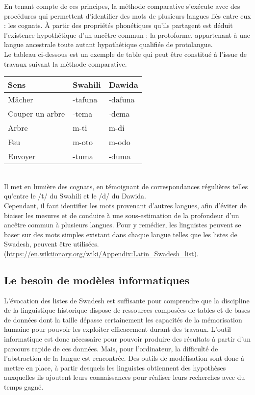 \documentclass[12pt, twoside]{report}
\begin{document}
En tenant compte de ces principes, la méthode comparative s'exécute avec des procédures qui permettent d'identifier des mots de plusieurs langues liés entre eux : les \glspl{cognat}. À partir des propriétés phonétiques qu'ils partagent est déduit l'existence hypothétique d'un ancêtre commun : la \gls{protoforme}, appartenant à une langue ancestrale toute autant hypothétique qualifiée de protolangue.\\
Le tableau ci-dessous est un exemple de table qui peut être constitué à l'issue de travaux suivant la méthode comparative.

\begin{tabularx}{0.8\textwidth} {
  | >{\centering\arraybackslash}X
  | >{\centering\arraybackslash}X
  | >{\centering\arraybackslash}X | }
\hline
 Sens & Swahili & Dawida \\
\hline
Mâcher  & -tafuna  & -dafuna  \\
\hline
Couper un arbre & -tema & -dema \\
\hline
Arbre & m-ti & m-di \\
\hline
Feu & m-oto & m-odo\\
\hline
Envoyer & -tuma & -duma \\
\hline
\end{tabularx}\\

Il met en lumière des cognats, en témoignant de correspondances régulières telles qu'entre le /t/ du Swahili et le /d/ du Dawida.\\ 

Cependant, il faut identifier les mots provenant d'autres langues, afin d'éviter de biaiser les mesures et de conduire à une sous-estimation de la profondeur d'un ancêtre commun à plusieurs langues. Pour y remédier, les linguistes peuvent se baser sur des mots simples existant dans chaque langue telles que les listes de Swadesh, peuvent être utilisées. (\url{https://en.wiktionary.org/wiki/Appendix:Latin_Swadesh_list}).\\ 

\subsection{Le besoin de modèles informatiques}

L'évocation des listes de Swadesh est suffisante pour comprendre que la discipline de la linguistique historique dispose de ressources composées de tables et de bases de données dont la taille dépasse certainement les capacités de la mémorisation humaine pour pouvoir les exploiter efficacement durant des travaux. L'outil informatique est donc nécessaire pour pouvoir produire des résultats à partir d'un parcours rapide de ces données. Mais, pour l'ordinateur, la difficulté de l'abstraction de la langue est rencontrée. Des outils de modélisation sont donc à mettre en place, à partir desquels les linguistes obtiennent des hypothèses auxquelles ils ajoutent leurs connaissances pour réaliser leurs recherches avec du temps gagné.
\end{document}
